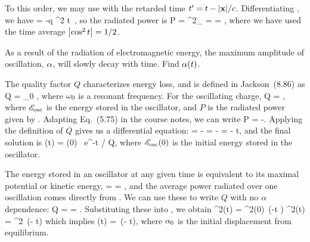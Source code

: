 \begin{solution}
	To this order, we may use  with the retarded time $t' = t - \abs{\vb{x}} / c$.  Differentiating , we have
	\beq
		 = -q \alp \omg^2 \cos \omg t \,\zh,
	\eeq
	so the radiated power is
	\beqn \label{radpow}
		P =  ^2_\ret
		=  
		= ,
	\eeqn
	where we have used the time average $\abs{\cos^2 t} = 1/2$.
\end{solution}



\begin{problem}
	As a result of the radiation of electromagnetic energy, the maximum amplitude of oscillation, $\alpha$, will slowly decay with time.  Find $\alpha(t)$.
\end{problem}

\begin{solution}
	The quality factor $Q$ characterizes energy loss, and is defined in Jackson~(8.86) as
	\beq
		Q = \omg_0 ,
	\eeq
	where $\omega_0$ is a resonant frequency.  For the oscillating charge,
	\beq
		Q = \omg {},
	\eeq
	where $\mathscr{E}_\text{osc}$ is the energy stored in the oscillator, and $P$ is the radiated power given by .  Adapting Eq.~(5.75) in the course notes, we can write
	\beq
		P = -.
	\eeq
	Applying the definition of $Q$ gives us a differential equation:
	\beq
		 = - \sEosc
		\qimplies
		\int \frac{\dd{\sEosc}}{\sEosc} = - \int {}
		\qimplies
		\ln{} = - t,
	\eeq
	and the final solution is
	\beqn \label{ensol}
		\sEosc(t) = \sEosc(0) \, e^{-\omg t / Q},
	\eeqn
	where $\mathscr{E}_\text{osc}(0)$ is the initial energy stored in the oscillator.
	
	The energy stored in an oscillator at any given time is equivalent to its maximal potential or kinetic energy,
	\beq
		\sEosc =  = ,
	\eeq
	and the average power radiated over one oscillation comes directly from .  We can use these to write $Q$ with no $\alpha$ dependence:
	\beq
		Q = \omg {} 
		= .
	\eeq
	Substituting these into , we obtain
	\beq
		 \alp^2(t) =  \alp^2(0) \,\exp(-\omg t )
		\qimplies
		\alp^2(t) = \alpo^2 \,\exp(- t)
	\eeq
	which implies
	\beq
		\alp(t) = \alpo \,\exp(- t),
	\eeq
	where $\alpha_0$ is the initial displacement from equilibrium.
\end{solution}